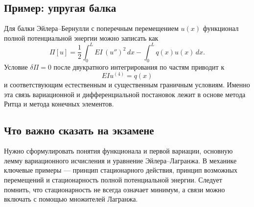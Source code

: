 \subsection{Пример: упругая балка}

Для балки Эйлера--Бернулли с поперечным перемещением $u(x)$ функционал
полной потенциальной энергии можно записать как
\[
\Pi[u]
=\frac12\int_0^L EI\,(u'')^2\,dx
-\int_0^L q(x)u(x)\,dx.
\]
Условие $\delta\Pi=0$ после двукратного интегрирования по частям приводит к
\[
EIu^{(4)}=q(x)
\]
и соответствующим естественным и существенным граничным условиям.
Именно эта связь вариационной и дифференциальной постановок лежит в
основе метода Ритца и метода конечных элементов.

\subsection{Что важно сказать на экзамене}

Нужно сформулировать понятия функционала и первой вариации, основную
лемму вариационного исчисления и уравнение Эйлера--Лагранжа. В механике
ключевые примеры --- принцип стационарного действия, принцип возможных
перемещений и стационарность полной потенциальной энергии. Следует
помнить, что стационарность не всегда означает минимум, а связи можно
включать с помощью множителей Лагранжа.

\newpage
